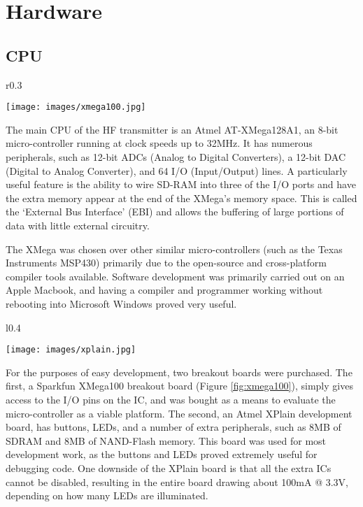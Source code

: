 \documentclass[a4paper,12pt]{article}
\begin{document}
\newpage
\section{Hardware}

\subsection{CPU}
\begin{wrapfigure}{r}{0.3\textwidth}
  \begin{center}
    \texttt{[image: images/xmega100.jpg]}
  \end{center}
  \caption{XMega100 Breakout Board}
  \label{fig:xmega100}
\end{wrapfigure}
The main CPU of the HF transmitter is an Atmel AT-XMega128A1, an 8-bit micro-controller running at clock speeds up to 32MHz. It has numerous peripherals, such as 12-bit ADCs (Analog to Digital Converters), a 12-bit DAC (Digital to Analog Converter), and 64 I/O (Input/Output) lines\citep{ref:xmega}. A particularly useful feature is the ability to wire SD-RAM into three of the I/O ports and have the extra memory appear at the end of the XMega's memory space. This is called the `External Bus Interface' (EBI) and allows the buffering of large portions of data with little external circuitry.

The XMega was chosen over other similar micro-controllers (such as the Texas Instruments MSP430) primarily due to the open-source and cross-platform compiler tools available. Software development was primarily carried out on an Apple Macbook, and having a compiler and programmer working without rebooting into Microsoft Windows proved very useful.

\begin{wrapfigure}{l}{0.4\textwidth}
  \begin{center}
    \texttt{[image: images/xplain.jpg]}
  \end{center}
  \caption{XPlain Development Board}
  \label{fig:xplain}
\end{wrapfigure}

For the purposes of easy development, two breakout boards were purchased. The first, a Sparkfun XMega100 breakout board (Figure \ref{fig:xmega100}), simply gives access to the I/O pins on the IC, and was bought as a means to evaluate the micro-controller as a viable platform. The second, an Atmel XPlain development board, has buttons, LEDs, and a number of extra peripherals, such as 8MB of SDRAM and 8MB of NAND-Flash memory. This board was used for most development work, as the buttons and LEDs proved extremely useful for debugging code. One downside of the XPlain board is that all the extra ICs cannot be disabled, resulting in the entire board drawing about 100mA @ 3.3V, depending on how many LEDs are illuminated.
\end{document}
